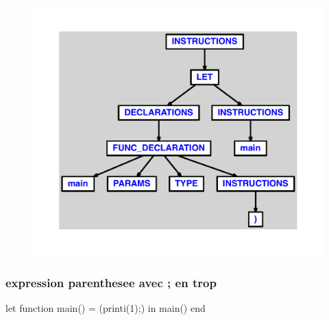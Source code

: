 \documentclass{article}
\begin{document}
\begin{figure}[H]\centering\includegraphics[max width=\textwidth]{ast/ast_33.pdf}\end{figure}\subsubsection{expression parenthesee avec ; en trop}
\begin{verbatimtab}
let function main() = (printi(1);) in main() end
\end{verbatimtab}
\end{document}
